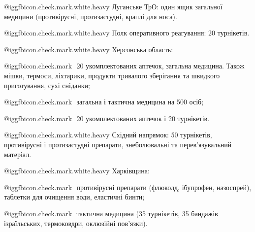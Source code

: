  @igg{fbicon.check.mark.white.heavy} ️Луганське ТрО: один ящик загальної медицини (противірусні, протизастудні,
краплі для носа).

 @igg{fbicon.check.mark.white.heavy} ️Полк оперативного реагування: 20 турнікетів. 

 @igg{fbicon.check.mark.white.heavy} ️Херсонська область: 

 @igg{fbicon.check.mark} ️ 20 укомплектованих аптечок, загальна медицина. Також мішки, термоси,
ліхтарики, продукти тривалого зберігання та швидкого приготування, сухі
сніданки;

 @igg{fbicon.check.mark} ️ загальна і тактична медицина на 500 осіб;

 @igg{fbicon.check.mark} ️ 20 укомплектованих аптечок і 20 турнікетів.

 @igg{fbicon.check.mark.white.heavy} ️Східний напрямок: 50 турнікетів, противірусні і протизастудні препарати,
знеболювальні та перев'язувальний матеріал. 

 @igg{fbicon.check.mark.white.heavy} ️Харківщина:

 @igg{fbicon.check.mark} ️ противірусні препарати (флюколд, ібупрофен, назоспрей), таблетки для очищення
води, еластичні бинти;

 @igg{fbicon.check.mark} ️ тактична медицина (35 турнікетів, 35 бандажів ізраїльських, термоковдри,
оклюзійні пов'язки).

